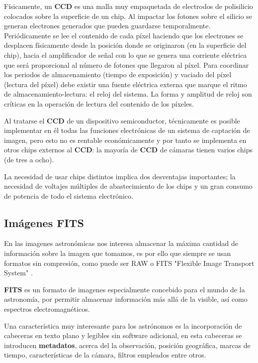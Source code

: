 \bigskip
Físicamente, un \textbf{CCD} es una malla muy empaquetada de electrodos de polisilicio colocados sobre la superficie de un chip. Al impactar los fotones sobre el silicio se generan electrones generados que pueden guardarse temporalmente. Periódicamente se lee el contenido de cada píxel haciendo que los electrones se desplacen físicamente desde la posición donde se originaron (en la superficie del chip), hacia el amplificador de señal con lo que se genera una corriente eléctrica que será proporcional al número de fotones que llegaron al píxel. Para coordinar los periodos de almacenamiento (tiempo de exposición) y vaciado del píxel (lectura del píxel) debe existir una fuente eléctrica externa que marque el ritmo de almacenamiento-lectura: el reloj del sistema. La forma y amplitud de reloj son críticas en la operación de lectura del contenido de los píxeles.

\bigskip
Al tratarse el \textbf{CCD} de un dispositivo semiconductor, técnicamente es posible implementar en él todas las funciones electrónicas de un sistema de captación de imagen, pero esto no es rentable económicamente y por tanto se implementa en otros chips externos al \textbf{CCD}: la mayoría de \textbf{CCD} de cámaras tienen varios chips (de tres a ocho).

\bigskip
La necesidad de usar chips distintos implica dos desventajas importantes; la necesidad de voltajes múltiples de abastecimiento de los chips y un gran consumo de potencia de todo el sistema electrónico.


\subsection{Imágenes FITS}

En las imagenes astronómicas nos interesa almacenar la máxima cantidad de información sobre la imagen que tomamos, es por ello que siempre se usan formatos sin compresión, como puede ser RAW \cite{Raw} o FITS "Flexible Image Transport System"  \cite{FITS}.

\bigskip
\textbf{FITS} es un formato de imagenes especialmente concebido para el mundo de la astronomía, por permitir almacenar información más allá de la visible, así como espectros electromagnéticos.

\bigskip
Una característica muy interesante para los astrónomos es la incorporación de cabeceras en texto plano y legibles sin software adicional, en esta cabeceras se introducen \textbf{metadatos}, acerca del la observación,  posición geográfica, marcas de tiempo,  características de la cámara, filtros empleados entre otros.

